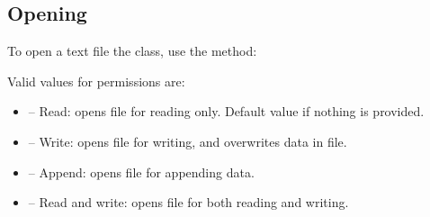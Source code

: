 \documentclass[a4paper,10pt,openany,english]{sphinxmanual}
\begin{document}
\subsection{Opening}
\label{tutorial:opening}
To open a text file the {\hyperref[egadsapi:egads.input.text_file_io.EgadsFile]{}} class, use the  method:

\begin{sphinxVerbatim}[commandchars=\\\{\}]
 
  
\end{sphinxVerbatim}

Valid values for permissions are:
\begin{itemize}
\item {} 
 -- Read: opens file for reading only. Default value if nothing is provided.

\item {} 
 -- Write: opens file for writing, and overwrites data in file.

\item {} 
 -- Append: opens file for appending data.

\item {} 
 -- Read and write: opens file for both reading and writing.

\end{itemize}
\end{document}
